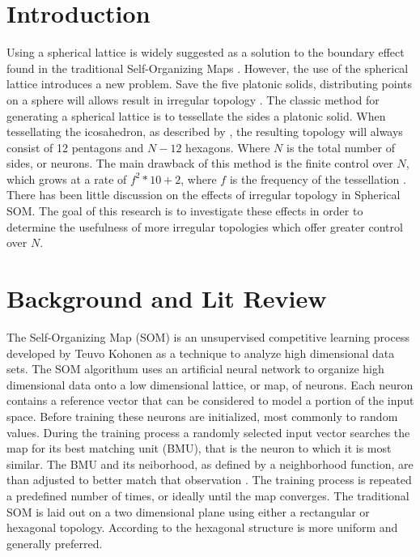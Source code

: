 \documentclass[11pt]{article}
\begin{document}
\section{Introduction}
Using a spherical lattice is widely suggested as a solution to the boundary
effect found in the traditional Self-Organizing Maps \citep{ritter99, boudjemai2003,
sangole03, Wu:2006lr, Nishio:2006fk}.  However, the use of the spherical lattice
introduces a new problem.  Save the five platonic solids, distributing points on
a sphere will allows result in irregular topology \citep{ritter99}.  The classic
method for generating a spherical lattice is to tessellate the sides a platonic
solid.  When tessellating the icosahedron, as described by \cite{Wu:2006lr}, the
resulting topology will always consist of 12 pentagons and \(N-12\) hexagons.
Where \(N\) is the total number of sides, or neurons.  The main drawback of this
method is the finite control over \(N\), which grows at a rate of \(f^2*10+2\),
where \(f\) is the frequency of the tessellation \citep{Wu:2006lr}.  There has been
little discussion on the effects of irregular topology in Spherical SOM. The goal of
this research is to investigate these effects in order to determine the usefulness of
more irregular topologies which offer greater control over \(N\).

\section{Background and Lit Review}
The Self-Organizing Map (SOM) is an unsupervised competitive learning process
developed by Teuvo Kohonen as a technique to analyze high dimensional data sets.
The SOM algorithum uses an artificial neural network to organize high
dimensional data onto a low dimensional lattice, or map, of neurons.  Each
neuron contains a reference vector that can be considered to model a portion of
the input space. Before training these neurons are initialized, most commonly to
random values.  During the training process a randomly selected input vector
searches the map for its best matching unit (BMU), that is the neuron to which
it is most similar. The BMU and its neiborhood, as defined by a neighborhood
function, are than adjusted to better match that observation
\citep{Kohonen2000}.  The training process is repeated a predefined number of
times, or ideally until the map converges.  The traditional SOM is laid out on a
two dimensional plane using either a rectangular or hexagonal topology.
According to \cite{Wu:2006lr} the hexagonal structure is more uniform and
generally preferred.
\end{document}
